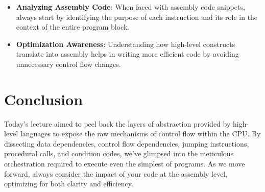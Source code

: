 \documentclass{article}
\begin{document}
\begin{itemize}
    \item \textbf{Analyzing Assembly Code}: When faced with assembly code snippets, always start by identifying the purpose of each instruction and its role in the context of the entire program block.
    \item \textbf{Optimization Awareness}: Understanding how high-level constructs translate into assembly helps in writing more efficient code by avoiding unnecessary control flow changes.
\end{itemize}

\section{Conclusion}

Today's lecture aimed to peel back the layers of abstraction provided by high-level languages to expose the raw mechanisms of control flow within the CPU. By dissecting data dependencies, control flow dependencies, jumping instructions, procedural calls, and condition codes, we've glimpsed into the meticulous orchestration required to execute even the simplest of programs. As we move forward, always consider the impact of your code at the assembly level, optimizing for both clarity and efficiency.
\end{document}
